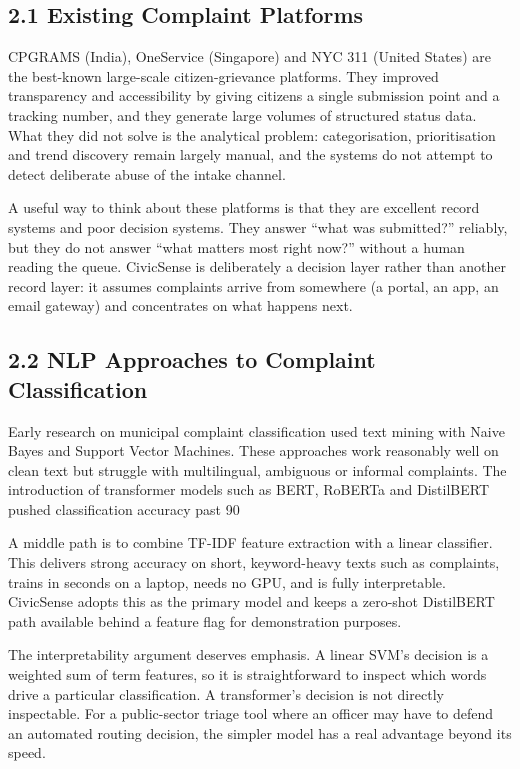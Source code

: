 \documentclass[10pt,letterpaper,oneside]{article}\usepackage{geometry}\geometry{top=1in,bottom=1in,left=1in,right=1in,includeheadfoot}\usepackage{xcolor}\definecolor{color@navy}{HTML}{1F3B63}\definecolor{color@grey}{HTML}{404040}\definecolor{color@hdr}{HTML}{F2F4F7}\usepackage{titlesec}\titleformat{\section}  {\normalfont\huge\bfseries\color@navy}  {}{0pt}{\MakeUppercase}\titleformat{\subsection}  {\normalfont\Large\bfseries\color@navy}  {}{0pt}{}\titleformat{\subsubsection}  {\normalfont\large\bfseries\color@navy}  {}{0pt}{}\titlespacing*{\section}{0pt}{14pt}{6pt}\titlespacing*{\subsection}{0pt}{10pt}{4pt}\titlespacing*{\subsubsection}{0pt}{8pt}{3pt}\setlength{\parindent}{0pt}\setlength{\parskip}{0.6em}\parindent=0pt\usepackage{enumitem}\setlist{nosep,leftmargin=*,itemsep=0pt,topsep=2pt,partopsep=0pt}\usepackage{array}\usepackage{booktabs}\usepackage{caption}\captionsetup{font={small,it},labelfont={bf},labelsep=period,  parskip=2pt,skip=4pt,list=no}\captionsetup[table]{labelfont={bf,small,color@navy},name=Table}\usepackage{graphicx}\usepackage{verbatim}\usepackage{ragged2e}\usepackage{longtable}\usepackage{tabularx}\usepackage{multirow}\usepackage{colortbl}\definecolor{rowshade}{HTML}{F2F4F7}\usepackage{tikz}\usetikzlibrary{positioning,calc}\usepackage[hidelinks]{hyperref}\hypersetup{colorlinks=true,linkcolor=color@navy,urlcolor=color@navy}\pagestyle{fancy}\fancyhf{}\renewcommand{\headrulewidth}{0.4pt}\fancyhead[L]{\small\color@navy CivicSense — Project Report}\fancyhead[R]{\small\color@grey October 11, 2026}\fancyfoot[C]{\small\color@grey An Integrated Intelligent Triage Pipelin}\fancyfoot[R]{\small\color@grey Page \thepage}\usepackage{setspace}\setstretch{1.15}\AtBeginDocument{  \hypersetup{pdftitle={An Integrated Intelligent Triage Pipeline for AI-Enhanced Citizen Complaint Management},    pdfauthor={CivicSense Project Team},    pdfsubject={Project Report},    pdfkeywords={smart cities, NLP, complaint management, e-governance},    pdfcreator={CivicSense Project Team}  }}
\begin{document}
\subsection*{2.1 Existing Complaint Platforms}
CPGRAMS (India), OneService (Singapore) and NYC 311 (United States) are the best-known large-scale citizen-grievance platforms. They improved transparency and accessibility by giving citizens a single submission point and a tracking number, and they generate large volumes of structured status data. What they did not solve is the analytical problem: categorisation, prioritisation and trend discovery remain largely manual, and the systems do not attempt to detect deliberate abuse of the intake channel.

A useful way to think about these platforms is that they are excellent record systems and poor decision systems. They answer “what was submitted?” reliably, but they do not answer “what matters most right now?” without a human reading the queue. CivicSense is deliberately a decision layer rather than another record layer: it assumes complaints arrive from somewhere (a portal, an app, an email gateway) and concentrates on what happens next.

\subsection*{2.2 NLP Approaches to Complaint Classification}
Early research on municipal complaint classification used text mining with Naive Bayes and Support Vector Machines. These approaches work reasonably well on clean text but struggle with multilingual, ambiguous or informal complaints. The introduction of transformer models such as BERT, RoBERTa and DistilBERT pushed classification accuracy past 90%

A middle path is to combine TF-IDF feature extraction with a linear classifier. This delivers strong accuracy on short, keyword-heavy texts such as complaints, trains in seconds on a laptop, needs no GPU, and is fully interpretable. CivicSense adopts this as the primary model and keeps a zero-shot DistilBERT path available behind a feature flag for demonstration purposes.

The interpretability argument deserves emphasis. A linear SVM’s decision is a weighted sum of term features, so it is straightforward to inspect which words drive a particular classification. A transformer’s decision is not directly inspectable. For a public-sector triage tool where an officer may have to defend an automated routing decision, the simpler model has a real advantage beyond its speed.
\end{document}
